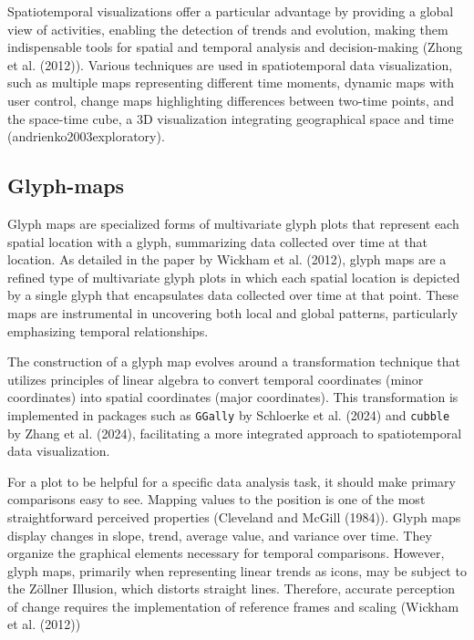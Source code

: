 Spatiotemporal visualizations offer a particular advantage by providing a global view of activities, enabling the detection of trends and evolution, making them indispensable tools for spatial and temporal analysis and decision-making (Zhong et al. (2012)). Various techniques are used in spatiotemporal data visualization, such as multiple maps representing different time moments, dynamic maps with user control, change maps highlighting differences between two-time points, and the space-time cube, a 3D visualization integrating geographical space and time (andrienko2003exploratory).

\hypertarget{glyph-maps}{%
\subsection{Glyph-maps}\label{glyph-maps}}

Glyph maps are specialized forms of multivariate glyph plots that represent each spatial location with a glyph, summarizing data collected over time at that location. As detailed in the paper by Wickham et al. (2012), glyph maps are a refined type of multivariate glyph plots in which each spatial location is depicted by a single glyph that encapsulates data collected over time at that point. These maps are instrumental in uncovering both local and global patterns, particularly emphasizing temporal relationships.

The construction of a glyph map evolves around a transformation technique that utilizes principles of linear algebra to convert temporal coordinates (minor coordinates) into spatial coordinates (major coordinates). This transformation is implemented in packages such as \texttt{GGally} by Schloerke et al. (2024) and \texttt{cubble} by Zhang et al. (2024), facilitating a more integrated approach to spatiotemporal data visualization.

For a plot to be helpful for a specific data analysis task, it should make primary comparisons easy to see. Mapping values to the position is one of the most straightforward perceived properties (Cleveland and McGill (1984)). Glyph maps display changes in slope, trend, average value, and variance over time. They organize the graphical elements necessary for temporal comparisons. However, glyph maps, primarily when representing linear trends as icons, may be subject to the Zöllner Illusion, which distorts straight lines. Therefore, accurate perception of change requires the implementation of reference frames and scaling (Wickham et al. (2012))

